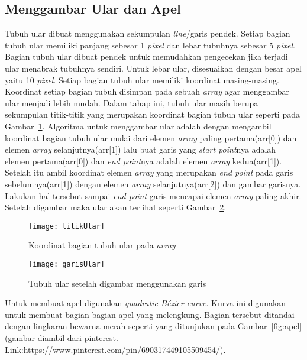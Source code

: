 \subsection{Menggambar Ular dan Apel}
Tubuh ular dibuat menggunakan sekumpulan \textit{line}/garis pendek. Setiap bagian tubuh ular memiliki panjang sebesar 1 \textit{pixel} dan lebar tubuhnya sebesar 5 \textit{pixel}. Bagian tubuh ular dibuat pendek untuk memudahkan pengecekan jika terjadi ular menabrak tubuhnya sendiri. Untuk lebar ular, disesuaikan dengan besar apel yaitu 10 \textit{pixel}. Setiap bagian tubuh ular memiliki koordinat masing-masing. Koordinat setiap bagian tubuh disimpan pada sebuah \textit{array} agar menggambar ular menjadi lebih mudah. Dalam tahap ini, tubuh ular masih berupa sekumpulan titik-titik yang merupakan koordinat bagian tubuh ular seperti pada Gambar~\ref{fig:titikUlar}. Algoritma untuk menggambar ular adalah dengan mengambil koordinat bagian tubuh ular mulai dari elemen \textit{array} paling pertama(arr[0]) dan elemen \textit{array} selanjutnya(arr[1]) lalu buat garis yang \textit{start point}nya adalah elemen pertama(arr[0]) dan \textit{end point}nya adalah elemen \textit{array} kedua(arr[1]). Setelah itu ambil koordinat elemen \textit{array} yang merupakan \textit{end point} pada garis sebelumnya(arr[1]) dengan elemen \textit{array} selanjutnya(arr[2]) dan gambar garisnya. Lakukan hal tersebut sampai \textit{end point} garis mencapai elemen \textit{array} paling akhir. Setelah digambar maka ular akan terlihat seperti Gambar~\ref{fig:garisUlar}.

\begin{figure}[H]
	\centering  
	\texttt{[image: titikUlar]}  
	\caption[Koordinat bagian tubuh ular pada \textit{array}]{Koordinat bagian tubuh ular pada \textit{array}}
	\label{fig:titikUlar} 
\end{figure}

\begin{figure}[H]
	\centering  
	\texttt{[image: garisUlar]}  
	\caption[Tubuh ular setelah digambar menggunakan garis]{Tubuh ular setelah digambar menggunakan garis}
	\label{fig:garisUlar} 
\end{figure}

Untuk membuat apel digunakan \textit{quadratic B\'ezier curve}. Kurva ini digunakan untuk membuat bagian-bagian apel yang melengkung. Bagian tersebut ditandai dengan lingkaran bewarna merah seperti yang ditunjukan pada Gambar~\ref{fig:apel}(gambar diambil dari pinterest. Link:https://www.pinterest.com/pin/690317449105509454/).

